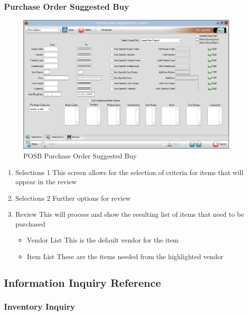 \subsubsection{Purchase Order Suggested Buy}


\begin{figure}[H]
	\includegraphics[width=\textwidth]{../img/image101}
	\caption{POSB Purchase Order Suggested Buy}
\end{figure}

\begin{enumerate}
	\item Selections 1 \textemdash This screen allows for the selection of criteria for items that will appear in the review
	\item Selections 2 \textemdash Further options for review
	\item Review \textemdash This will process and show the resulting list of items that need to be purchased
	\begin{itemize}
		\item Vendor List \textemdash This is the default vendor for the item
		\item Item List \textemdash These are the items needed from the highlighted vendor
	\end{itemize}
\end{enumerate}

\subsection{Information Inquiry Reference}

\subsubsection{Inventory Inquiry}

